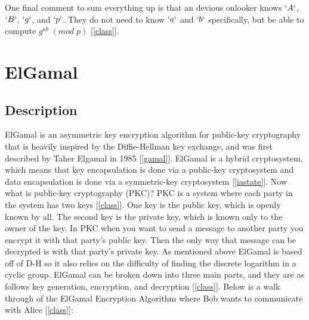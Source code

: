 \documentclass[12pt]{article}
\begin{document}
One final comment to sum everything up is that an devious onlooker knows $`A`$, $`B`$, $`g`$, and $`p`$. They do not need to know $`a`$ and $`b`$ specifically, but be able to compute $g^{ab}\;(mod\;p)$ [\ref{class}].

\section{ElGamal}

\subsection{Description}
ElGamal is an asymmetric key encryption algorithm for public-key cryptography that is heavily inspired by the Diffie-Hellman key exchange, and was first described by Taher Elgamal in 1985 [\ref{gamal}]. ElGamal is a hybrid cryptosystem, which means that key encapsulation is done via a public-key cryptosystem and data encapsulation is done via a symmetric-key cryptosystem [\ref{iastate}]. Now what is public-key cryptography (PKC)? PKC is a system where each party in the system has two keys [\ref{class}]. One key is the public key, which is openly known by all. The second key is the private key, which is known only to the owner of the key. In PKC when you want to send a message to another party you encrypt it with that party's public key. Then the only way that message can be decrypted is with that party's private key. As mentioned above ElGamal is based off of D-H so it also relies on the difficulty of finding the discrete logarithm in a cyclic group. ElGamal can be broken down into three main parts, and they are as follows key generation, encryption, and decryption [\ref{class}]. Below is a walk through of the ElGamal Encryption Algorithm where Bob wants to communicate with Alice [\ref{class}]:\\
\end{document}
